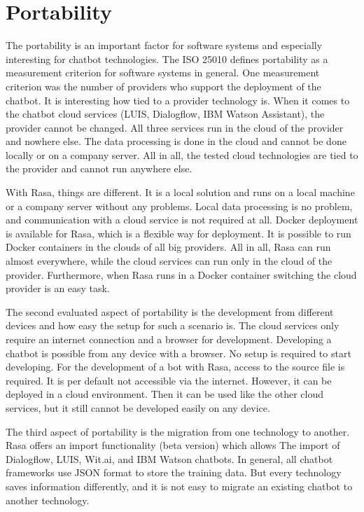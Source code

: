
\section*{Portability}
The portability is an important factor for software systems and especially interesting for chatbot technologies.
The ISO 25010 \cite{iso25010} defines portability as a measurement criterion for software systems in general.
One measurement criterion was the number of providers who support the deployment of the chatbot.
It is interesting how tied to a provider technology is.
When it comes to the chatbot cloud services (LUIS, Dialogflow, IBM Watson Assistant), the provider cannot be changed.
All three services run in the cloud of the provider and nowhere else.
The data processing is done in the cloud and cannot be done locally or on a company server.
All in all, the tested cloud technologies are tied to the provider and cannot run anywhere else.

With Rasa, things are different.
It is a local solution and runs on a local machine or a company server without any problems.
Local data processing is no problem, and communication with a cloud service is not required at all.
Docker deployment is available for Rasa, which is a flexible way for deployment.
It is possible to run Docker containers in the clouds of all big providers.
All in all, Rasa can run almost everywhere, while the cloud services can run only in the cloud of the provider.
Furthermore, when Rasa runs in a Docker container switching the cloud provider is an easy task.

The second evaluated aspect of portability is the development from different devices and how easy the setup for such a scenario is.
The cloud services only require an internet connection and a browser for development.
Developing a chatbot is possible from any device with a browser.
No setup is required to start developing.
For the development of a bot with Rasa, access to the source file is required.
It is per default not accessible via the internet.
However, it can be deployed in a cloud environment.
Then it can be used like the other cloud services, but it still cannot be developed easily on any device.

The third aspect of portability is the migration from one technology to another.
Rasa offers an import functionality (beta version) which allows The
import of Dialogflow, LUIS, Wit.ai, and IBM Watson chatbots.
In general, all chatbot frameworks use JSON format to store
the training data.
But every technology saves information differently, and it is not 
easy to migrate an existing chatbot to another technology.

